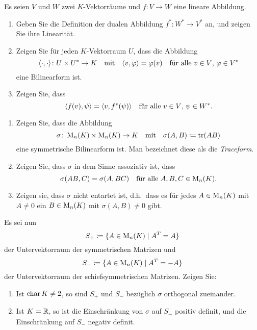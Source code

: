 \documentclass[a4paper,10pt]{scrartcl}
\begin{document}
\begin{question}
  Es seien $V$ und $W$ zwei $K$-Vektorräume und $f \colon V \to W$ eine lineare Abbildung.
  \begin{enumerate}[leftmargin=*]
    \item
      Geben Sie die Definition der dualen Abbildung $f^* \colon W^* \to V^*$ an, und zeigen Sie ihre Linearität.
    \item
      Zeigen Sie für jeden $K$-Vektorraum $U$, dass die Abbildung
      \[
        \langle \cdot, \cdot \rangle \colon U \times U^* \to K
        \quad\text{mit}\quad
        \langle v, \varphi \rangle = \varphi(v)
        \quad\text{für alle $v \in V$, $\varphi \in V^*$}
      \]
      eine Bilinearform ist.
    \item
      Zeigen Sie, dass
      \[
        \langle f(v), \psi \rangle = \langle v, f^*(\psi) \rangle
        \quad
        \text{für alle $v \in V$, $\psi \in W^*$}.
      \]
  \end{enumerate}
\end{question}


\begin{question}
  \begin{enumerate}[leftmargin=*]
    \item
      Zeigen Sie, dass die Abbildung
      \[
        \sigma \colon \operatorname{M}_n(K) \times \operatorname{M}_n(K) \to K
        \quad\text{mit}\quad
        \sigma(A, B) \coloneqq \operatorname{tr}(AB)
      \]
      eine symmetrische Bilinearform ist.
      Man bezeichnet diese als die \emph{Traceform}.
    \item
      Zeigen Sie, dass $\sigma$ in dem Sinne assoziativ ist, dass
      \[
        \sigma(AB, C) = \sigma(A, BC)
        \quad
        \text{für alle $A, B, C \in \operatorname{M}_n(K)$}.
      \]
    \item
      Zeigen sie, dass $\sigma$ nicht entartet ist, d.h.\ dass es für jedes $A \in \operatorname{M}_n(K)$ mit $A \neq 0$ ein $B \in \operatorname{M}_n(K)$ mit $\sigma(A, B) \neq 0$ gibt.
  \end{enumerate}
  Es sei nun
  \[
    S_+ \coloneqq \{ A \in \operatorname{M}_n(K) \mid A^T = A \}
  \]
  der Untervektorraum der symmetrischen Matrizen und
  \[
    S_- \coloneqq \{ A \in \operatorname{M}_n(K) \mid A^T = -A \}
  \]
  der Untervektorraum der schiefsymmetrischen Matrizen.
  Zeigen Sie:
  \begin{enumerate}[leftmargin=*, resume]
    \item
      Ist $\operatorname{char} K \neq 2$, so sind $S_+$ und $S_-$ bezüglich $\sigma$ orthogonal zueinander.
    \item
      Ist $K = \mathbb{R}$, so ist die Einschränkung von $\sigma$ auf $S_+$ positiv definit, und die Einschränkung auf $S_-$ negativ definit.
  \end{enumerate}
\end{question}
\end{document}
